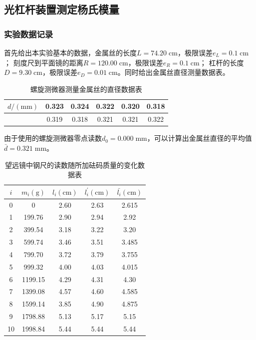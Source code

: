 \documentclass[a4paper]{ctexart}
\def\mm{\mathrm{mm}}
\def\cm{\mathrm{cm}}
\def\g{\mathrm{g}}
\begin{document}
	\subsection{光杠杆装置测定杨氏模量}
	\subsubsection{实验数据记录}
	首先给出本实验基本的数据，金属丝的长度$L=74.20\;\cm$，极限误差$e_{L}=0.1\;\cm$；
	刻度尺到平面镜的距离$R=120.00\;\cm$，极限误差$e_{R}=0.1\;\cm$；
	杠杆的长度$D=9.30\;\cm$，极限误差$e_{D}=0.01\;\cm$。同时给出金属丝直径测量数据表。
	\begin{table}[htbp]
		\centering
		\caption{螺旋测微器测量金属丝的直径数据表}
		\begin{tabular}{cccccc}
			\toprule[1.5pt]
			$d/(\mm)$ & 0.323 & 0.324 & 0.322 & 0.320 & 0.318 \\
			\midrule
			         &  0.319 & 0.318 & 0.321 & 0.321 & 0.322 \\
			\bottomrule[1.5pt]
		\end{tabular}
	\end{table}
	\par 
	由于使用的螺旋测微器零点读数$d_{0}=0.000\;\mm$，可以计算出金属丝直径的平均值
	$\bar{d} = 0.321\;\mm$。
	\begin{table}[htbp]
		\centering
		\caption{望远镜中钢尺的读数随所加砝码质量的变化数据表}
		\begin{tabular}{ccccc}
			\toprule[1.5pt]
			$i$ & $m_{i}(\g)$ & $l_{i}(\cm)$ & $l_{i}^{'}(\cm)$ & $\bar{l_{i}}(\cm)$ \\
			\midrule
			0  & 0       & 2.60 & 2.63 & 2.615 \\
			1  & 199.76  & 2.90 & 2.94 & 2.92 \\
			2  & 399.54  & 3.18 & 3.22 & 3.20 \\
			3  & 599.74  & 3.46 & 3.51 & 3.485 \\
			4  & 799.70  & 3.72 & 3.79 & 3.755 \\
			5  & 999.32  & 4.00 & 4.03 & 4.015 \\
			6  & 1199.15 & 4.29 & 4.31 & 4.30 \\
			7  & 1399.08 & 4.57 & 4.60 & 4.585 \\ 
			8  & 1599.14 & 3.85 & 4.90 & 4.875 \\ 
			9  & 1798.88 & 5.13 & 5.17 & 5.15 \\
			10 & 1998.84 & 5.44 & 5.44 & 5.44 \\
			\bottomrule[1.5pt]
		\end{tabular}
	\end{table}
\end{document}
